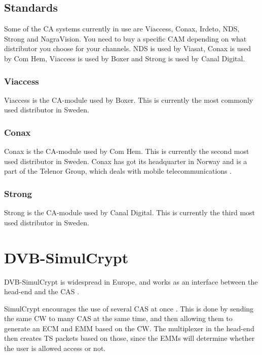 \subsection{Standards}
Some of the CA systems currently in use are Viaccess, Conax, Irdeto, NDS, Strong 
and NagraVision. You need to buy a specific CAM depending on what distributor 
you choose for your channels. NDS is used by Viasat, Conax is used by Com Hem, Viaccess is used by Boxer and Strong is used by Canal Digital.

\subsubsection{Viaccess}
Viaccess is the CA-module used by Boxer. This is currently the most commonly used
 distributor in Sweden.

\subsubsection{Conax}
Conax is the CA-module used by Com Hem. This is currently the second most used
distributor in Sweden. Conax has got its headquarter in Norway and is a part of the Telenor Group, which deals with mobile telecommunications \citep{Conax}.

\subsubsection{Strong}
Strong is the CA-module used by Canal Digital. This is currently the third most 
used distributor in Sweden.

\section{DVB-SimulCrypt} \label{sec:Simul}
DVB-SimulCrypt is widespread in Europe, and works as an interface between the 
head-end and the CAS \citep{SimulCrypt:2008}.

SimulCrypt encourages the use of several CAS at once \citep[p. 17]{SimulCrypt:2008}. This is done by sending the same CW to many CAS at the same time, and then 
allowing them to generate an ECM and EMM based on the CW. The multiplexer in the 
head-end then creates TS packets based on those, since the EMMs will determine 
whether the user is allowed access or not. 

